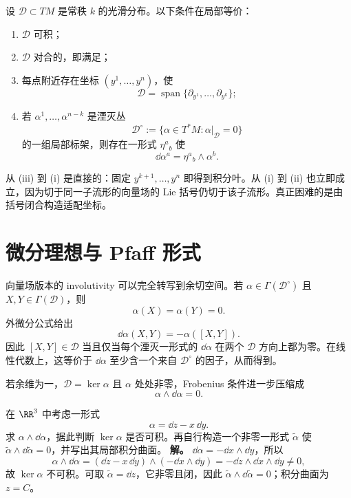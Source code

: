 \begin{theorem}[Frobenius 定理]\label{thm:math-dg-frobenius}
设 $\mathcal D\subset TM$ 是常秩 $k$ 的光滑分布。以下条件在局部等价：
\begin{enumerate}[label=(\roman*)]
\item $\mathcal D$ 可积；
\item $\mathcal D$ 对合的，即满足；
\item 每点附近存在坐标 $(y^1,\ldots,y^n)$，使
\[
\mathcal D
=\operatorname{span}\{\partial_{y^1},\ldots,\partial_{y^k}\};
\]
\item 若 $\alpha^1,\ldots,\alpha^{n-k}$ 是湮灭丛
\[
\mathcal D^\circ
:=\{\alpha\in T^*M:\alpha|_{\mathcal D}=0\}
\]
的一组局部标架，则存在一形式 $\eta^a{}_b$ 使
\begin{equation}\label{eq:math-dg-frobenius-pfaff}
\dd\alpha^a=\eta^a{}_b\wedge\alpha^b.
\end{equation}
\end{enumerate}
\end{theorem}

从 (iii) 到 (i) 是直接的：固定 $y^{k+1},\ldots,y^n$ 即得到积分叶。从 (i) 到 (ii) 也立即成立，因为切于同一子流形的向量场的 Lie 括号仍切于该子流形。真正困难的是由括号闭合构造适配坐标。

\section{微分理想与 Pfaff 形式}

向量场版本的 involutivity 可以完全转写到余切空间。若 $\alpha\in\Gamma(\mathcal D^\circ)$ 且 $X,Y\in\Gamma(\mathcal D)$，则
\[
\alpha(X)=\alpha(Y)=0.
\]
外微分公式给出
\begin{equation}\label{eq:math-dg-frobenius-dalpha-bracket}
\dd\alpha(X,Y)
=-\alpha([X,Y]).
\end{equation}
因此 $[X,Y]\in\mathcal D$ 当且仅当每个湮灭一形式的 $\dd\alpha$ 在两个 $\mathcal D$ 方向上都为零。在线性代数上，这等价于 $\dd\alpha$ 至少含一个来自 $\mathcal D^\circ$ 的因子，从而得到。

若余维为一，$\mathcal D=\ker\alpha$ 且 $\alpha$ 处处非零，Frobenius 条件进一步压缩成
\begin{equation}\label{eq:math-dg-frobenius-codim-one}
{\alpha\wedge\dd\alpha=0.}
\end{equation}


\par
\begin{workedexample}
在 \(\RR^3\) 中考虑一形式
\[
\alpha=\dd z-x\,\dd y.
\]
求 \(\alpha\wedge\dd\alpha\)，据此判断 \(\ker\alpha\) 是否可积。再自行构造一个非零一形式 \(\widetilde\alpha\) 使 \(\widetilde\alpha\wedge\dd\widetilde\alpha=0\)，并写出其局部积分曲面。
\textbf{解。} \(\dd\alpha=-\dd x\wedge\dd y\)，所以
\[
\alpha\wedge\dd\alpha=(\dd z-x\,\dd y)\wedge(-\dd x\wedge\dd y)
=-\dd z\wedge\dd x\wedge\dd y\ne0,
\]
故 \(\ker\alpha\) 不可积。可取 \(\widetilde\alpha=\dd z\)，它非零且闭，因此 \(\widetilde\alpha\wedge\dd\widetilde\alpha=0\)；积分曲面为 \(z=C\)。
\end{workedexample}
\par

